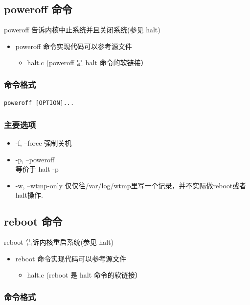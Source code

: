\subsection{poweroff 命令}

poweroff 告诉内核中止系统并且关闭系统(参见 halt)

\begin{itemize}
\item
  poweroff 命令实现代码可以参考源文件
  \begin{itemize}
  \item
    halt.c (poweroff 是 halt 命令的软链接）
  \end{itemize}
\end{itemize}
\subsubsection{命令格式}

{\begin{shaded}\begin{verbatim}
poweroff [OPTION]...
\end{verbatim}\end{shaded}}
\subsubsection{主要选项}

\begin{itemize}
\item
  -f, --force 强制关机
\item
  -p, --poweroff\\ 等价于 halt -p
\item
  -w, --wtmp-only
  仅仅往/var/log/wtmp里写一个记录，并不实际做reboot或者halt操作.
\end{itemize}
\subsection{reboot 命令}

reboot 告诉内核重启系统(参见 halt)

\begin{itemize}
\item
  reboot 命令实现代码可以参考源文件
  \begin{itemize}
  \item
    halt.c (reboot 是 halt 命令的软链接）
  \end{itemize}
\end{itemize}
\subsubsection{命令格式}

